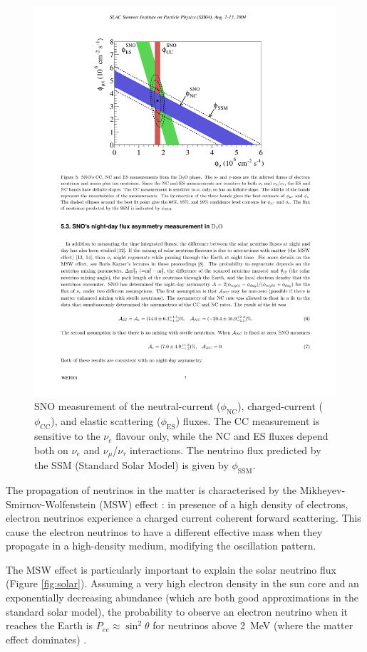 \begin{figure}[htbp]
    \centering
    \includegraphics[width=0.7\linewidth]{figures/sno_plot.pdf}
    \caption{SNO measurement of the neutral-current ($\phi_{\mathrm{NC}}$), charged-current ($\phi_{\mathrm{CC}}$), and elastic scattering ($\phi_{\mathrm{ES}}$) fluxes. The CC measurement is sensitive to the $\nu_e$ flavour only, while the NC and ES fluxes depend both on $\nu_e$ and $\nu_{\mu}$/$\nu_{\tau}$ interactions. The neutrino flux predicted by the SSM (Standard Solar Model) is given by $\phi_{\mathrm{SSM}}$.}
    \label{fig:sno}
\end{figure}

The propagation of neutrinos in the matter is characterised by the Mikheyev-Smirnov-Wolfenstein (MSW) effect \cite{Wolfenstein:1977ue}: in presence of a high density of electrons, electron neutrinos experience a charged current coherent forward scattering. This cause the electron neutrinos to have a different effective mass when they propagate in a high-density medium, modifying the oscillation pattern. 

The MSW effect is particularly important to explain the solar neutrino flux (Figure \ref{fig:solar}). Assuming a very high electron density in the sun core and an exponentially decreasing abundance (which are both good approximations in the standard solar model), the probability to observe an electron neutrino when it reaches the Earth is $P_{ee} \approx \sin^2\theta$ for neutrinos above 2~MeV (where the matter effect dominates) \cite{deGouvea:2004gd}.


